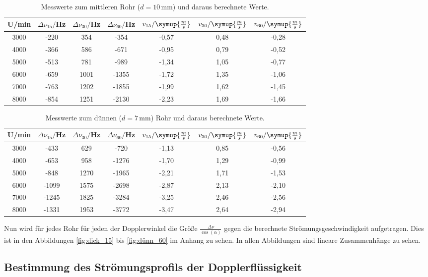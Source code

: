\begin{table}[htp]
	\begin{center}
    \caption{Messwerte zum mittleren Rohr ($d=10\,$mm) und daraus berechnete Werte.}
    \label{tab:mittel}
		\begin{tabular}{ccccccc}
		\toprule
			{U/min} & {$\Delta \nu_{15}/$Hz} & {$\Delta \nu_{30}/$Hz} & {$\Delta \nu_{60}/$Hz} &
      {$v_{15}/\symup{\frac{m}{s}}$} & {$v_{30}/\symup{\frac{m}{s}}$} & {$v_{60}/\symup{\frac{m}{s}}$}\\
			\midrule
			3000 & -220 & 354 & -354 & -0,57 & 0,48 & -0,28\\
			4000 & -366 & 586 & -671 & -0,95 & 0,79 & -0,52\\
			5000 & -513 & 781 & -989 & -1,34 & 1,05 & -0,77\\
			6000 & -659 & 1001 & -1355 & -1,72 & 1,35 & -1,06\\
			7000 & -763 & 1202 & -1855 & -1,99 & 1,62 & -1,45\\
			8000 & -854 & 1251 & -2130 & -2,23 & 1,69 & -1,66\\
		\bottomrule
		\end{tabular}
	\end{center}
\end{table}

\begin{table}[htp]
	\begin{center}
    \caption{Messwerte zum dünnen ($d=7\,$mm) Rohr und daraus berechnete Werte.}
    \label{tab:dünn}
		\begin{tabular}{ccccccc}
		\toprule
			{U/min} & {$\Delta \nu_{15}/$Hz} & {$\Delta \nu_{30}/$Hz} & {$\Delta \nu_{60}/$Hz} &
      {$v_{15}/\symup{\frac{m}{s}}$} & {$v_{30}/\symup{\frac{m}{s}}$} & {$v_{60}/\symup{\frac{m}{s}}$}\\
			\midrule
			3000 & -433 & 629 & -720 & -1,13 & 0,85 & -0,56\\
			4000 & -653 & 958 & -1276 & -1,70 & 1,29 & -0,99\\
			5000 & -848 & 1270 & -1965 & -2,21 & 1,71 & -1,53\\
			6000 & -1099 & 1575 & -2698 & -2,87 & 2,13 & -2,10\\
			7000 & -1245 & 1825 & -3284 & -3,25 & 2,46 & -2,56\\
			8000 & -1331 & 1953 & -3772 & -3,47 & 2,64 & -2,94\\
		\bottomrule
		\end{tabular}
	\end{center}
\end{table}

Nun wird für jedes Rohr für jeden der Dopplerwinkel die Größe $\frac{\Delta \nu}{\cos(\alpha)}$
gegen die berechnete Strömungsgeschwindigkeit aufgetragen. Dies ist in den Abbildungen
\ref{fig:dick_15} bis \ref{fig:dünn_60} im Anhang zu sehen. In allen Abbildungen sind
lineare Zusammenhänge zu sehen.

\subsection{Bestimmung des Strömungsprofils der Dopplerflüssigkeit}
\label{subsec:strömungsprofil}
